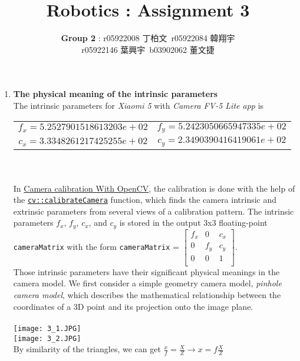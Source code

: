 \documentclass[12pt, a4paper]{article}
\date{}
\title{\vspace{-3.0cm} Robotics : Assignment 3 \\ \vspace{0.5cm}}
\author{\textbf{Group 2} : \normalsize{r05922008 丁柏文\mbox{ }r05922084 韓翔宇} \\ \hspace{2.48cm} \normalsize{r05922146 葉興宇\mbox{ }b03902062 董文捷}}
\begin{document}
\maketitle
\begin{enumerate}

\item \textbf{The physical meaning of the intrinsic parameters} \\
The intrinsic parameters for \textit{Xiaomi 5} with \textit{Camera FV-5 Lite app} is \\ 
\begin{tabular}[t]{cc}
$f_x = 5.2527901518613203e+02$ & $f_y = 5.2423050665947335e+02$ \\ 
$c_x = 3.3348261217425255e+02$ & $c_y = 2.3490390416419061e+02$ \\
\end{tabular} \\
\vspace*{0cm} \\
In \href{http://docs.opencv.org/master/d4/d94/tutorial_camera_calibration.html}{Camera calibration With OpenCV}, the calibration is done with the help of the 
\href{http://docs.opencv.org/master/d9/d0c/group__calib3d.html#ga3207604e4b1a1758aa66acb6ed5aa65d}{\texttt{cv::calibrateCamera}} function, which finds the camera intrinsic and extrinsic parameters from several views of a calibration pattern.
The intrinsic parameters $f_x$, $f_y$, $c_x$, and $c_y$ is stored in the output 3x3 floating-point \texttt{cameraMatrix} with the form \texttt{cameraMatrix} = 
$\begin{bmatrix}
f_x & 0 & c_x \\
0 & f_y & c_y \\ 
0 & 0 & 1 \\
\end{bmatrix}$. \\
Those intrinsic parameters have their significant physical meanings in the camera model. We first consider a simple geometry camera model, \textit{pinhole camera model}, which describes the mathematical relationship between the coordinates of a 3D point and its projection onto the image plane. \\
\vspace*{0cm} \\
\texttt{[image: 3\_1.JPG]} \\
\newpage
\texttt{[image: 3\_2.JPG]} \\
By similarity of the triangles, we can get $\displaystyle \frac{x}{f} = \frac{X}{Z} \rightarrow x = f \frac{X}{Z}$ \\

\end{enumerate}
\end{document}
